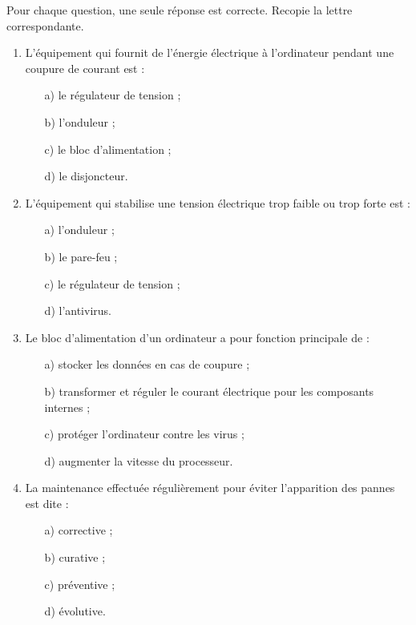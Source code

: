 \documentclass[11pt]{article}
\begin{document}
\begin{exercice}
Pour chaque question, une seule réponse est correcte. Recopie la lettre correspondante.
\begin{enumerate}
\item L'équipement qui fournit de l'énergie électrique à l'ordinateur pendant une coupure de courant est :
\begin{enumerate}
\item[a)] le régulateur de tension ;
\item[b)] l'onduleur ;
\item[c)] le bloc d'alimentation ;
\item[d)] le disjoncteur.
\end{enumerate}
\item L'équipement qui stabilise une tension électrique trop faible ou trop forte est :
\begin{enumerate}
\item[a)] l'onduleur ;
\item[b)] le pare-feu ;
\item[c)] le régulateur de tension ;
\item[d)] l'antivirus.
\end{enumerate}
\item Le bloc d'alimentation d'un ordinateur a pour fonction principale de :
\begin{enumerate}
\item[a)] stocker les données en cas de coupure ;
\item[b)] transformer et réguler le courant électrique pour les composants internes ;
\item[c)] protéger l'ordinateur contre les virus ;
\item[d)] augmenter la vitesse du processeur.
\end{enumerate}
\item La maintenance effectuée régulièrement pour éviter l'apparition des pannes est dite :
\begin{enumerate}
\item[a)] corrective ;
\item[b)] curative ;
\item[c)] préventive ;
\item[d)] évolutive.
\end{enumerate}
\end{enumerate}
\end{exercice}
\end{document}
